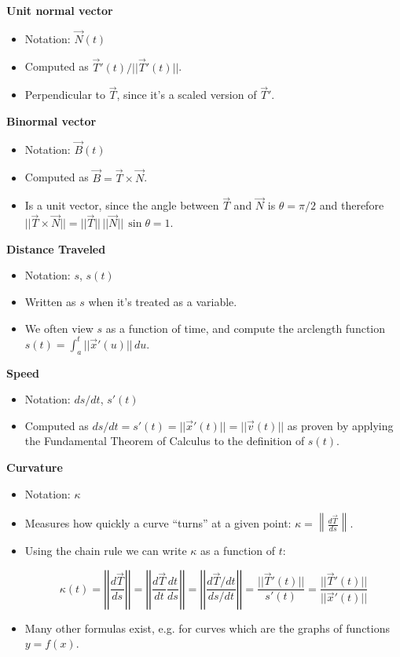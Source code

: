 \documentclass{ximera}
\begin{document}
\textbf{Unit normal vector}
\begin{itemize}
\item Notation: $\vec{N}(t)$%
\item Computed as $\vec{T}'(t) / ||\vec{T}'(t)||$.  
\item Perpendicular to $\vec{T}$, since it's a scaled version of $\vec{T}'$. 
\end{itemize}

\textbf{Binormal vector}
\begin{itemize}
\item Notation: $\vec{B}(t)$%
\item Computed as $\vec{B} = \vec{T} \times \vec {N}$.  
\item Is a unit vector, since the angle between $\vec{T}$ and $\vec{N}$ is $\theta=\pi/2$ and therefore $ ||\vec{T} \times \vec{N}|| = ||\vec{T}|| \, ||\vec{N}|| \, \sin \theta = 1 $.
\end{itemize}


\textbf{Distance Traveled}
\begin{itemize}
\item Notation: $s$, $s(t)$ 
\item Written as $s$ when it's treated as a variable.  
\item We often view $s$ as a function of time, and compute the arclength function
$ s(t) = \int_a^t ||\vec{x}'(u)|| \, du $.
\end{itemize}


\textbf{Speed}
\begin{itemize}
\item Notation: $ds/dt$, $s'(t)$
\item Computed as $ds/dt = s'(t) = ||\vec{x}'(t)||=||\vec{v}(t)||$ as proven by applying the Fundamental Theorem of Calculus to the definition of $s(t)$.
\end{itemize}

\textbf{Curvature}
\begin{itemize}
\item Notation: $\kappa$
\item Measures how quickly a curve ``turns'' at a given point: $\kappa = \left\| \frac{d\vec{T}}{ds} \right\|$.  
\item Using the chain rule we can write $\kappa$ as a function of $t$:

\[ \kappa(t) = \left| \left| \frac{d\vec{T}}{ds} \right| \right| = \left| \left| \frac{d\vec{T}}{dt} \frac{dt}{ds} \right| \right| = 
\left| \left| \frac{d\vec{T}/dt}{ds/dt} \right| \right| = \frac{||\vec{T}'(t)||}{s'(t)} = \frac{||\vec{T}'(t)||}{||\vec{x}'(t)||} \]
\item Many other formulas exist, e.g. for curves which are the graphs of functions $y=f(x)$.
\end{itemize}
\end{document}
